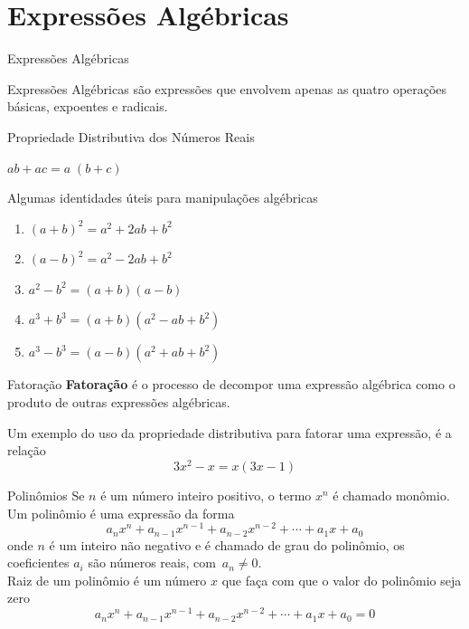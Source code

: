 \section{Expressões Algébricas}

\begin{teoria}{Expressões Algébricas}
    
    Expressões Algébricas são expressões que envolvem apenas as quatro operações básicas, expoentes e radicais.
    
    Propriedade Distributiva dos Números Reais
    \begin{propriedades}
        \item \( ab + ac = a\;(b+c) \)
    \end{propriedades}
    
    Algumas identidades úteis para manipulações algébricas
    \begin{enumerate}
        \item \( (a+b)^2 = a^2 + 2ab + b^2 \)
        \item \( (a-b)^2 = a^2 - 2ab + b^2 \)
        \item \( a^2 - b^2 = (a+b)(a-b) \)
        \item \( a^3 + b^3 = (a+b)(a^2-ab+b^2) \)
        \item \( a^3 - b^3 = (a-b)(a^2+ab+b^2) \)
    \end{enumerate}
\end{teoria}

\begin{teoria}{Fatoração}
    \textbf{Fatoração} é o processo de decompor uma expressão algébrica como o produto de outras expressões algébricas.
\end{teoria}
    
\begin{exemplos}
    \begin{exemplo}
        Um exemplo do uso da propriedade distributiva para fatorar uma expressão, é a relação
    \[ 3x^2 - x = x(3x-1)  \]    
    \end{exemplo}
\end{exemplos}

\begin{teoria}{Polinômios}
    Se $n$ é um número inteiro positivo, o termo $x^n$ é chamado monômio. 
    Um polinômio é uma expressão da forma
    \[ a_nx^n + a_{n-1}x^{n-1} + a_{n-2}x^{n-2} + \cdots + a_1x + a_0 \]
    onde $n$ é um inteiro não negativo e é chamado de grau do polinômio, 
    os coeficientes $a_i$ são números reais, com~$a_n\neq 0$.
    \\
    
    Raiz de um polinômio é um número $x$ que faça com que o valor do polinômio seja zero
    \[ a_nx^n + a_{n-1}x^{n-1} + a_{n-2}x^{n-2} + \cdots + a_1x + a_0 = 0 \]
\end{teoria}    

